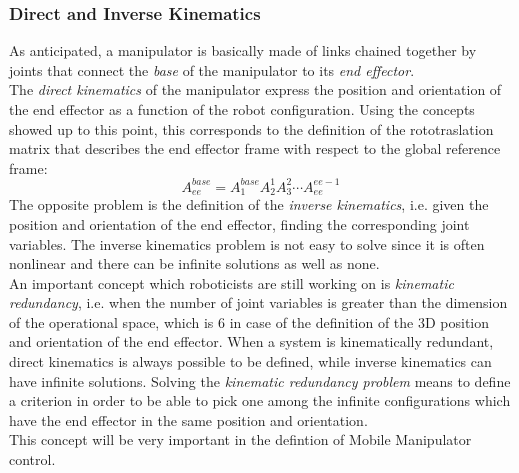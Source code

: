 \subsubsection{Direct and Inverse Kinematics} \label{dirinvkin}
As anticipated, a manipulator is basically made of links chained together by joints that connect the \textit{base} of the manipulator to its \textit{end effector}.\\
The \textit{direct kinematics} of the manipulator express the position and orientation of the end effector as a function of the robot configuration. Using the concepts showed up to this point, this corresponds to the definition of the rototraslation matrix that describes the end effector frame with respect to the global reference frame:
\begin{equation}\label{AAAA}
	A_{ee}^{base}=A_1^{base}A_2^1A_3^2\cdots A_{ee}^{ee-1}
\end{equation}
The opposite problem is the definition of the \textit{inverse kinematics}, i.e. given the position and orientation of the end effector, finding the corresponding joint variables. The inverse kinematics problem is not easy to solve since it is often nonlinear and there can be infinite solutions as well as none.\\
An important concept which roboticists are still working on is \textit{kinematic redundancy}, i.e. when the number of joint variables is greater than the dimension of the operational space, which is 6 in case of the definition of the 3D position and orientation of the end effector. 
When a system is kinematically redundant, direct kinematics is always possible to be defined, while inverse kinematics can have infinite solutions.
Solving the \textit{kinematic redundancy problem} means to define a criterion in order to be able to pick one among the infinite configurations which have the end effector in the same position and orientation.\\
This concept will be very important in the defintion of Mobile Manipulator control.
